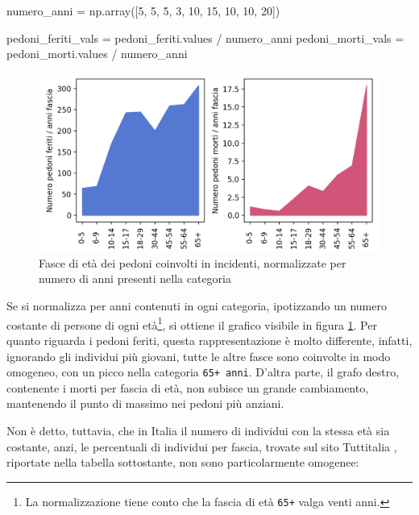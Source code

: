 \documentclass[a4paper,12pt]{report}
\newcommand{\columnstyle}[1]{\texttt{#1}}
\begin{document}
\begin{code}[language=Python]
numero_anni = np.array([5, 5, 5, 3, 10, 15, 10, 10, 20])

pedoni_feriti_vals = pedoni_feriti.values / numero_anni
pedoni_morti_vals = pedoni_morti.values / numero_anni
\end{code}

\begin{figure}
    \includegraphics[width=\linewidth]{../src/incidenti/incidenti_senza_coords/pedoni/eta_pedoni.png}
    \caption{Fasce di età dei pedoni coinvolti in incidenti, normalizzate per numero di anni 
    presenti nella categoria}
    \label{fig:eta-pedoni}
\end{figure}

Se si normalizza per anni contenuti in ogni categoria, ipotizzando un numero 
costante di persone di ogni età\footnote{La normalizzazione tiene conto 
che la fascia di età \columnstyle{65+} valga venti anni.}, 
si ottiene il grafico visibile in figura \ref{fig:eta-pedoni}. 
Per quanto riguarda i pedoni feriti, 
questa rappresentazione è molto differente, infatti, 
ignorando gli individui più giovani, tutte le altre fasce sono coinvolte 
in modo omogeneo, con un picco nella categoria \columnstyle{65+ anni}.
D'altra parte, il grafo destro, contenente i morti per fascia di età, 
non subisce un grande cambiamento, mantenendo il punto di massimo nei 
pedoni più anziani.

Non è detto, tuttavia, che in Italia il numero di individui con 
la stessa età sia costante, anzi, le percentuali di individui per fascia, 
trovate sul sito Tuttitalia \cite{TUTTITALIA:1}, riportate nella tabella 
sottostante, non sono particolarmente omogenee: 
\end{document}
